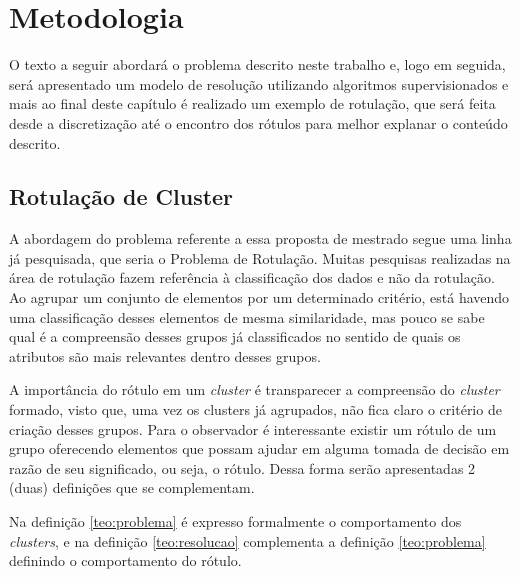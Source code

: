 \chapter{Metodologia} \label{cap:ferramentas}

O texto a seguir abordará o problema descrito neste trabalho e, logo em seguida, será apresentado um modelo de resolução utilizando algoritmos supervisionados e mais ao final deste capítulo é realizado um exemplo de rotulação, que será feita desde a discretização até o encontro dos rótulos para melhor explanar o conteúdo descrito. 

\section{Rotulação de Cluster}\label{cap:ferramentas:sec:considproblema}

A abordagem do problema referente a essa proposta de mestrado segue uma linha já pesquisada, que seria o Problema de Rotulação. Muitas pesquisas realizadas na área de rotulação fazem referência à classificação dos dados e não da rotulação. Ao agrupar um conjunto de elementos por um determinado critério, está havendo uma classificação desses elementos de mesma similaridade, mas pouco se sabe qual é a compreensão desses grupos já classificados no sentido de quais os atributos são mais relevantes dentro desses grupos. 

A importância do rótulo em um \textit{cluster} é transparecer a compreensão do \textit{cluster} formado, visto que, uma vez os clusters já agrupados, não fica claro o critério de criação desses grupos. Para o observador é interessante existir um rótulo de um grupo oferecendo elementos que possam ajudar em alguma tomada de decisão em razão de seu significado, ou seja, o rótulo. Dessa forma serão apresentadas 2 (duas) definições que se complementam. 

Na definição \ref{teo:problema} é expresso formalmente o comportamento dos \textit{clusters}, e na definição \ref{teo:resolucao} complementa a definição \ref{teo:problema} definindo o comportamento do rótulo.

